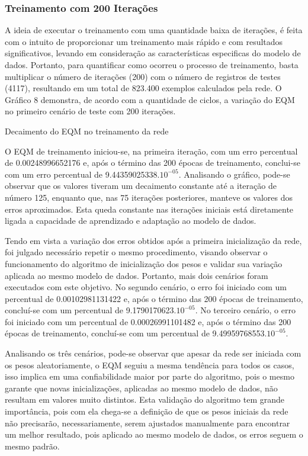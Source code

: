 \subsubsection{Treinamento com 200 Iterações}	
A ideia de executar o treinamento com uma quantidade baixa de iterações, é feita com o intuito de proporcionar um treinamento mais rápido e com resultados significativos, levando em consideração as características especificas do modelo de dados. Portanto, para quantificar como ocorreu o processo de treinamento, basta multiplicar o número de iterações (200) com o número de registros de testes (4117), resultando em um total de 823.400 exemplos calculados pela rede. O Gráfico 8 demonstra, de acordo com a quantidade de ciclos, a variação do EQM no primeiro cenário de teste com 200 iterações.
\begin{grafico}[h]
	\centering
	\caption{Decaimento do EQM no treinamento da rede}
	\label{lingua}
\end{grafico}

O EQM de treinamento iniciou-se, na primeira iteração, com um erro percentual de 0.00248996652176 e, após o término das 200 épocas de treinamento, conclui-se com um erro percentual de 9.44359025338.$10^{-05}$. Analisando o gráfico, pode-se observar que os valores tiveram um decaimento constante até a iteração de número 125, enquanto que, nas 75 iterações posteriores, manteve os valores dos erros aproximados. Esta queda constante nas iterações iniciais está diretamente ligada a capacidade de aprendizado e adaptação ao modelo de dados.

Tendo em vista a variação dos erros obtidos após a primeira inicialização da rede, foi julgado necessário repetir o mesmo procedimento, visando observar o funcionamento do algoritmo de inicialização dos pesos e validar sua variação aplicada ao mesmo modelo de dados. Portanto, mais dois cenários foram executados com este objetivo. No segundo cenário, o erro foi iniciado com um percentual de 0.00102981131422 e, após o término das 200 épocas de treinamento, concluí-se com um percentual de 9.1790170623.$10^{-05}$. No terceiro cenário, o erro foi iniciado com um percentual de 0.00026991101482 e, após o término das 200 épocas de treinamento, concluí-se com um percentual de 9.49959768553.$10^{-05}$.

Analisando os três cenários, pode-se observar que apesar da rede ser iniciada com os pesos aleatoriamente, o EQM seguiu a mesma tendência para todos os casos, isso implica em uma confiabilidade maior por parte do algoritmo, pois o mesmo garante que novas inicializações, aplicadas ao mesmo modelo de dados, não resultam em valores muito distintos. Esta validação do algoritmo tem grande importância, pois com ela chega-se a definição de que os pesos iniciais da rede não precisarão, necessariamente, serem ajustados manualmente para encontrar um melhor resultado, pois aplicado ao mesmo modelo de dados, os erros seguem o mesmo padrão.

